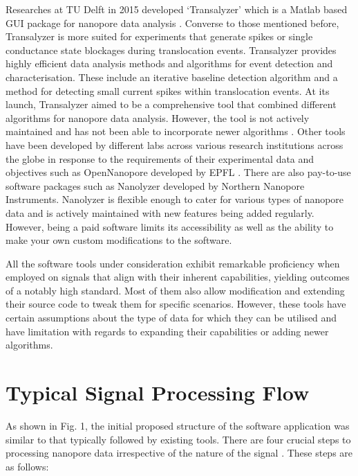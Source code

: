 \documentclass[journal]{IEEEtran}
\begin{document}
Researches at TU Delft in 2015 developed ‘Transalyzer’ which is a Matlab based GUI package for nanopore data analysis \cite{plesaDataAnalysisMethods2015}. Converse to those mentioned before, Transalyzer is more suited for experiments that generate spikes or single conductance state blockages during translocation events. Transalyzer provides highly efficient data analysis methods and algorithms for event detection and characterisation. These include an iterative baseline detection algorithm and a method for detecting small current spikes within translocation events. At its launch, Transalyzer aimed to be a comprehensive tool that combined different algorithms for nanopore data analysis. However, the tool is not actively maintained and has not been able to incorporate newer algorithms \cite{plesaDataAnalysisMethods2015}. Other tools have been developed by different labs across various research institutions across the globe in response to the requirements of their experimental data and objectives such as OpenNanopore developed by EPFL \cite{raillonFastAutomaticProcessing2012}. There are also pay-to-use software packages such as Nanolyzer developed by Northern Nanopore Instruments. Nanolyzer is flexible enough to cater for various types of nanopore data and is actively maintained with new features being added regularly. However, being a paid software limits its accessibility as well as the ability to make your own custom modifications to the software.

All the software tools under consideration exhibit remarkable proficiency when employed on signals that align with their inherent capabilities, yielding outcomes of a notably high standard. Most of them also allow modification and extending their source code to tweak them for specific scenarios. However, these tools have certain assumptions about the type of data for which they can be utilised and have limitation with regards to expanding their capabilities or adding newer algorithms.

\section{Typical Signal Processing Flow}
As shown in Fig. 1, the initial proposed structure of the software application was similar to that typically followed by existing tools. There are four crucial steps to processing nanopore data irrespective of the nature of the signal \cite{forstaterMOSAICModularSingleMolecule2016,gokhaleAdvancedSignalProcessing2023,plesaDataAnalysisMethods2015,wenGuideSignalProcessing2021}. These steps are as follows:
\end{document}
